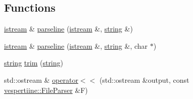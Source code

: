 \subsection*{Functions}
\begin{DoxyCompactItemize}
\item 
\hyperlink{group__vespertiine_ga338498d8eeb1f5a3da1f237df24c4250}{istream} \& \hyperlink{group__vespertiine_ga45bab8eea6e760c36a785c145af6ba25}{parseline} (\hyperlink{group__vespertiine_ga338498d8eeb1f5a3da1f237df24c4250}{istream} \&, \hyperlink{group__vespertiine_ga7e5191e67b3b71f8044b653a3f9b2065}{string} \&)
\item 
\hyperlink{group__vespertiine_ga338498d8eeb1f5a3da1f237df24c4250}{istream} \& \hyperlink{group__vespertiine_ga05687b76bc32ebfb4d97d92c417acaf6}{parseline} (\hyperlink{group__vespertiine_ga338498d8eeb1f5a3da1f237df24c4250}{istream} \&, \hyperlink{group__vespertiine_ga7e5191e67b3b71f8044b653a3f9b2065}{string} \&, char $\ast$)
\item 
\hyperlink{group__vespertiine_ga7e5191e67b3b71f8044b653a3f9b2065}{string} \hyperlink{group__vespertiine_ga5541b037e75ed830f526c2e073b26474}{trim} (\hyperlink{group__vespertiine_ga7e5191e67b3b71f8044b653a3f9b2065}{string})
\item 
std\+::ostream \& \hyperlink{group__vespertiine_ga1ca507e4b8f52201ba9cccaaf496e9be}{operator$<$$<$} (std\+::ostream \&output, const \hyperlink{classvespertiine_1_1FileParser}{vespertiine\+::\+File\+Parser} \&F)
\end{DoxyCompactItemize}
